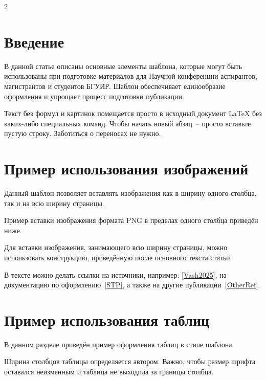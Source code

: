 \documentclass[a4paper,10pt,twoside]{article}
\begin{document}
\begin{multicols}{2} %

% 
\section*{Введение}
В данной статье описаны основные элементы шаблона, которые могут быть использованы при подготовке материалов для Научной конференции аспирантов, магистрантов и студентов БГУИР. Шаблон обеспечивает единообразие оформления и упрощает процесс подготовки публикации.

Текст без формул и картинок помещается просто в исходный документ LaTeX без каких-либо специальных команд. Чтобы начать новый абзац~-- просто вставьте пустую строку. Заботиться о переносах не нужно. 

\section{Пример использования изображений}
Данный шаблон позволяет вставлять изображения как в ширину одного столбца, так и на всю ширину страницы.

Пример вставки изображения формата PNG в пределах одного столбца приведён ниже.

Для вставки изображения, занимающего всю ширину страницы, можно использовать конструкцию, приведённую после основного текста статьи.

В тексте можно делать ссылки на источники, например: \ref{Vash2025}, на документацию по оформлению~\ref{STP}, а также на другие публикации~\ref{OtherRef}.

\section{Пример использования таблиц}
В данном разделе приведён пример оформления таблиц в стиле шаблона.

Ширина столбцов таблицы определяется автором. Важно, чтобы размер шрифта оставался неизменным и таблица не выходила за границы столбца.


\end{multicols}
\end{document}
